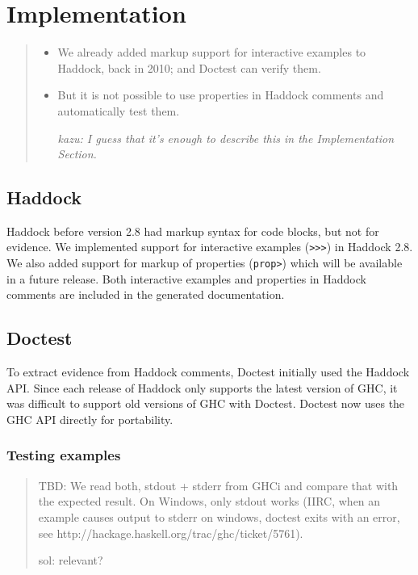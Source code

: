 \documentclass[preprint]{sigplanconf}
\begin{document}
\section{Implementation}

\begin{quote}
\begin{itemize}
    \item
        We already added markup support for interactive examples to
        Haddock, back in 2010; and Doctest can verify them.
    \item
        But it is not possible to use properties in Haddock comments
        and automatically test them.

    \emph{kazu: I guess that it's enough to describe this in the Implementation Section.}
\end{itemize}
\end{quote}

\subsection{Haddock}
\label{sec:haddock}

Haddock before version 2.8 had markup syntax for
code blocks, but not for evidence.
We implemented support for interactive examples ({\tt >>>}) in
Haddock 2.8.
We also added support for markup of properties ({\tt prop>}) which
will be available in a future release.
Both interactive examples and properties in Haddock comments are
included in the generated documentation.

\subsection{Doctest}
\label{sec:doctest}

To extract evidence from Haddock comments,
Doctest initially used the Haddock API.
Since each release of Haddock only supports the latest version of GHC,
it was difficult to support old versions of GHC with Doctest.
Doctest now uses the GHC API directly for portability.

\subsubsection{Testing examples}

\begin{quote}
    TBD: We read both, stdout + stderr from GHCi and compare that with the
    expected result.  On Windows, only stdout works (IIRC, when an
    example causes output to stderr on windows, doctest exits with an
    error, see http://hackage.haskell.org/trac/ghc/ticket/5761).

    sol: relevant?
\end{quote}
\end{document}
